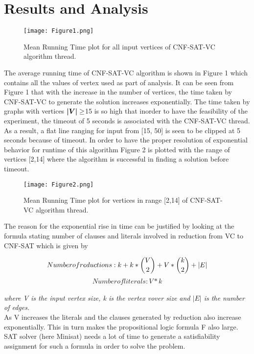 \documentclass{article}
\begin{document}
\section{Results and Analysis}

\begin{figure}[H]
\centering
\texttt{[image: Figure1.png]}
\caption{\label{fig:Figure1}Mean Running Time plot for all input vertices of CNF-SAT-VC algorithm thread.}
\end{figure}


The average running time of CNF-SAT-VC algorithm is shown in Figure 1 which contains all the values of vertex used as part of analysis. It can be seen from Figure 1 that with the increase in the number of vertices, the time taken by CNF-SAT-VC to generate the solution increases exponentially. The time taken by graphs with vertices  $\boldsymbol{$$|V|$$} \geq $15 is so high that inorder to have the feasibility of the experiment, the timeout of 5 seconds is associated with the CNF-SAT-VC thread. As a result, a flat line ranging for input from {[15, 50]} is seen to be clipped at 5 seconds because of timeout. In order to have the proper resolution of exponential behavior for runtime of this algorithm Figure 2 is plotted with the range of vertices [2,14] where the algorithm is successful in finding a solution before timeout.  \\

\begin{figure}[H]
\centering
\texttt{[image: Figure2.png]}
\caption{\label{fig:figure2}Mean Running Time plot for vertices in range [2,14] of CNF-SAT-VC algorithm thread.}
\end{figure}

The reason for the exponential rise in time can be justified by looking at the formula stating number of clauses and literals involved in reduction from VC to CNF-SAT which is given by 

$$Number\space of\space reductions:  k + k * {V \choose 2} + V * {k \choose 2} + |E|    $$
$$Number of literals : V * k$$
\\
\textit{where  V is the input vertex size, k is the vertex vover size and $|E|$ is the number of edges.  }\\


As V increases the literals and the clauses generated by reduction also increase exponentially. This in turn makes the propositional logic formula F also large. SAT solver (here Minisat) needs a lot of time to generate a satisfiability assignment for such a formula in order to solve the problem. \\
\end{document}
